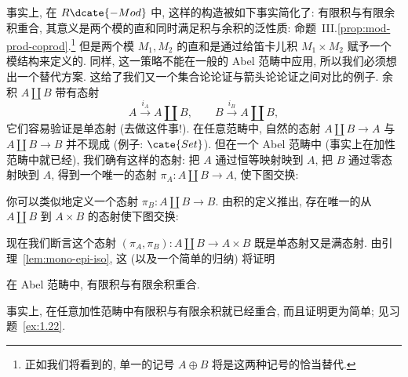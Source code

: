 \indent 事实上, 在 $R\dcate{-Mod}$ 中, 这样的构造被如下事实简化了: 有限积与有限余积重合, 其意义是两个模的直和同时满足积与余积的泛性质: 命题~III.\ref{prop:mod-prod-coprod}.\footnote{正如我们将看到的, 单一的记号 $A\oplus B$ 将是这两种记号的恰当替代.}
\indent 但是两个模 $M_1,M_2$ 的直和是通过给笛卡儿积 $M_1\times M_2$ 赋予一个模结构来定义的. 同样, 这一策略不能在一般的 Abel 范畴中应用, 所以我们必须想出一个替代方案. 这给了我们又一个集合论论证与箭头论论证之间对比的例子.
余积 $A\amalg B$ 带有态射
\[
A\xrightarrow{i_A} A\amalg B,\qquad B\xrightarrow{i_B} A\amalg B,
\]
它们容易验证是单态射 (去做这件事!). 在任意范畴中, 自然的态射 $A\amalg B\to A$ 与 $A\amalg B\to B$ 并不现成 (例子: $\cate{Set}$). 但在一个 Abel 范畴中 (事实上在加性范畴中就已经), 我们确有这样的态射: 把 $A$ 通过恒等映射映到 $A$, 把 $B$ 通过零态射映到 $A$, 得到一个唯一的态射 $\pi_A:A\amalg B\to A$, 使下图交换:
\begin{center}
\end{center}
你可以类似地定义一个态射 $\pi_B:A\amalg B\to B$. 由积的定义推出, 存在唯一的从 $A\amalg B$ 到 $A\times B$ 的态射使下图交换:
\begin{center}
\end{center}
\indent 现在我们断言这个态射 $(\pi_A,\pi_B):A\amalg B\to A\times B$ 既是单态射又是满态射. 由引理~\ref{lem:mono-epi-iso}, 这 (以及一个简单的归纳) 将证明

\begin{proposition}\label{prop:finite-products-coproducts-coincide}
在 Abel 范畴中, 有限积与有限余积重合.
\end{proposition}

\indent 事实上, 在任意加性范畴中有限积与有限余积就已经重合, 而且证明更为简单; 见习题~\ref{ex:1.22}.

